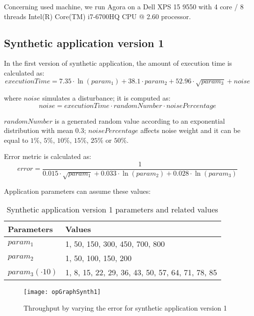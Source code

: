 Concerning used machine, we run Agora on a Dell XPS 15 9550 with 4 core / 8 threads Intel(R) Core(TM) i7-6700HQ CPU @ 2.60 processor.


\subsection{Synthetic application version 1}

In the first version of synthetic application, the amount of execution time is calculated as:
\[
executionTime = 7.35 \cdot \ln{(param_1)} + 38.1 \cdot param_2 + 52.96 \cdot \sqrt{param_3} + noise
\]

where $noise$ simulates a disturbance; it is computed as:
\[
noise = executionTime \cdot randomNumber \cdot noisePercentage
\]

$randomNumber$ is a generated random value according to an exponential distribution with mean 0.3; $noisePercentage$ affects noise weight and it can be equal to $1\%$, $5\%$, $10\%$, $15\%$, $25\%$ or $50\%$.

Error metric is calculated as:
\[
error = \dfrac{1}{0.015 \cdot \sqrt{param_1} + 0.033 \cdot \ln{(param_2)} + 0.028 \cdot \ln{(param_3)}}
\]

Application parameters can assume these values:

\begin{table}[H]

    \centering

    \begin{tabular}{ll}
    
        \toprule
        Parameters & Values \\
        \midrule
        $param_1$ & 1, 50, 150, 300, 450, 700, 800 \\
        $param_2$ & 1, 50, 100, 150, 200 \\
        $param_3 (\cdot 10)$ & 1, 8, 15, 22, 29, 36, 43, 50, 57, 64, 71, 78, 85 \\
        \bottomrule 
    
    \end{tabular}

    \caption{Synthetic application version 1 parameters and related values}

\end{table}

\begin{figure}[h]

    \centering
    \texttt{[image: opGraphSynth1]}
    \caption{Throughput by varying the error for synthetic application version 1}
    \label{fig::opListSynth1}
    
\end{figure}

